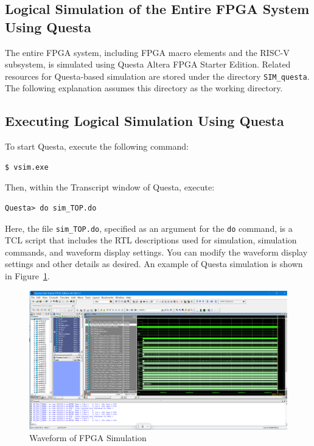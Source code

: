 \subsection{Logical Simulation of the Entire FPGA System Using Questa}
The entire FPGA system, including FPGA macro elements and the RISC-V subsystem, is simulated using Questa Altera FPGA Starter Edition. Related resources for Questa-based simulation are stored under the directory \texttt{SIM\_questa}. The following explanation assumes this directory as the working directory.

\subsection{Executing Logical Simulation Using Questa}
To start Questa, execute the following command:

\begin{verbatim}
$ vsim.exe
\end{verbatim}

Then, within the Transcript window of Questa, execute:

\begin{verbatim}
Questa> do sim_TOP.do
\end{verbatim}

Here, the file \texttt{sim\_TOP.do}, specified as an argument for the \texttt{do} command, is a TCL script that includes the RTL descriptions used for simulation, simulation commands, and waveform display settings. You can modify the waveform display settings and other details as desired. An example of Questa simulation is shown in Figure~\ref{fig:WAVEFPGA}.

\begin{figure}[htbp]
  \includegraphics[width=1.0\textwidth]{./Figure/WAVEFPGA.png}
  \caption{Waveform of FPGA Simulation}
  \label{fig:WAVEFPGA}
\end{figure}


